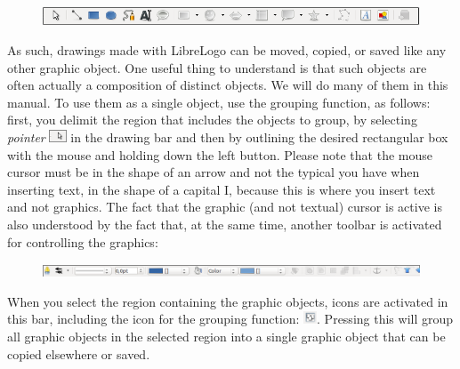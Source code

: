 \begin{figure}[h]
   \centering
   \includegraphics[width=12.0cm]{./images/librelogo/DrawToolbar.png}
   \label{DrawToolbar}
\end{figure}

As such, drawings made with LibreLogo can be moved, copied, or saved like any other graphic object. One useful thing to understand is that such objects are often actually a composition of distinct objects. We will do many of them in this manual. To use them as a single object, use the grouping function, as follows: first, you delimit the region that includes the objects to group, by selecting \textit{pointer} \includegraphics[height=1em]{./images/librelogo/Pointer_LO.png} in the drawing bar and then by outlining the desired rectangular  box with the mouse and holding down the left button. Please note that the mouse cursor must be in the shape of an arrow and not the typical you have when inserting text, in the shape of a capital I, because this is where you insert text and not graphics. The fact that the graphic (and not textual) cursor is active is also understood by the fact that, at the same time, another toolbar is activated for controlling the graphics:

\begin{figure}[h]
   \centering
   \includegraphics[width=12.0cm]{./images/librelogo/DrawToolbar2.png}
   \label{DrawToolbar2}
\end{figure}

When you select the region containing the graphic objects, icons are activated in this bar, including the icon for the grouping function: \includegraphics[height=1em]{./images/librelogo/RaggruppamentoLO.png}. Pressing this will group all graphic objects in the selected region into a single graphic object that can be copied elsewhere or saved. 

